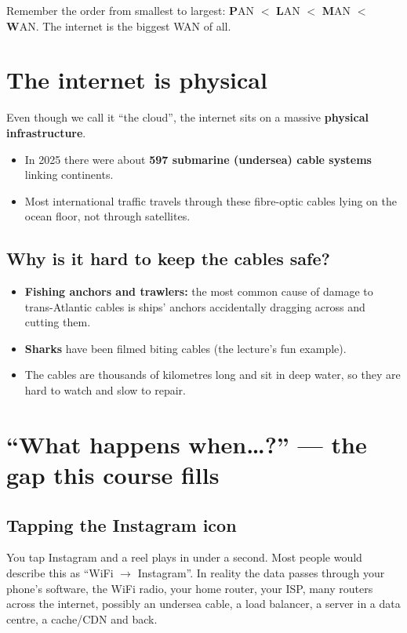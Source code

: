 \begin{examtip}
Remember the order from smallest to largest: \textbf{P}AN $<$ \textbf{L}AN $<$ \textbf{M}AN $<$ \textbf{W}AN. The internet is the biggest WAN of all.
\end{examtip}

\section{The internet is physical}

Even though we call it ``the cloud'', the internet sits on a massive \textbf{physical infrastructure}.

\begin{itemize}
  \item In 2025 there were about \textbf{597 submarine (undersea) cable systems} linking continents.
  \item Most international traffic travels through these fibre-optic cables lying on the ocean floor, not through satellites.
\end{itemize}

\subsection{Why is it hard to keep the cables safe?}
\begin{itemize}
  \item \textbf{Fishing anchors and trawlers:} the most common cause of damage to trans-Atlantic cables is ships' anchors accidentally dragging across and cutting them.
  \item \textbf{Sharks} have been filmed biting cables (the lecture's fun example).
  \item The cables are thousands of kilometres long and sit in deep water, so they are hard to watch and slow to repair.
\end{itemize}

\section{``What happens when\ldots?'' --- the gap this course fills}

\subsection{Tapping the Instagram icon}
You tap Instagram and a reel plays in under a second. Most people would describe this as ``WiFi $\to$ Instagram''. In reality the data passes through your phone's software, the WiFi radio, your home router, your ISP, many routers across the internet, possibly an undersea cable, a load balancer, a server in a data centre, a cache/CDN and back.

